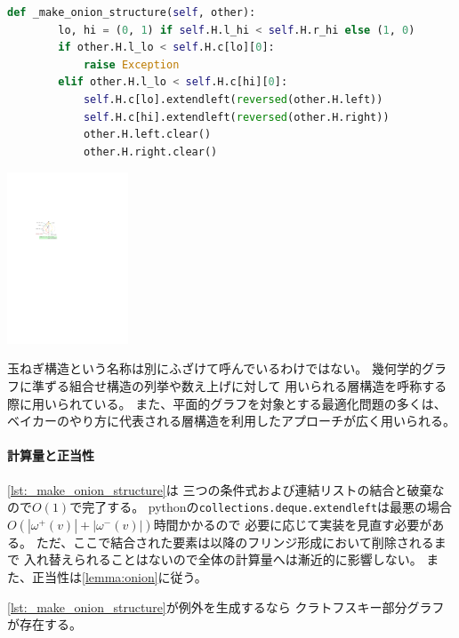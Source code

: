 \begin{paracol}{2}
\begin{lstlisting}[language=Python, caption=\_make\_onion\_structure,
                   label=lst:_make_onion_structure]
    def _make_onion_structure(self, other):
        lo, hi = (0, 1) if self.H.l_hi < self.H.r_hi else (1, 0)
        if other.H.l_lo < self.H.c[lo][0]:
            raise Exception
        elif other.H.l_lo < self.H.c[hi][0]:
            self.H.c[lo].extendleft(reversed(other.H.left))
            self.H.c[hi].extendleft(reversed(other.H.right))
            other.H.left.clear()
            other.H.right.clear()
\end{lstlisting}


\switchcolumn
\vspace{1.\intextsep}
\centering
\includegraphics[width=0.27\textwidth]{figures/illegal_onion_conditions.pdf}
\end{paracol}

玉ねぎ構造という名称は別にふざけて呼んでいるわけではない。
幾何学的グラフに準ずる組合せ構造の列挙や数え上げに対して
用いられる層構造を呼称する際に用いられている。
また、平面的グラフを対象とする最適化問題の多くは、
ベイカーのやり方に代表される層構造を利用したアプローチが広く用いられる。

\paragraph{計算量と正当性}
\lstrefname\ref{lst:_make_onion_structure}は
三つの条件式および連結リストの結合と破棄なので$O(1)$で完了する。
pythonの{\tt collections.deque.extendleft}は最悪の場合
$O(|\omega^+(v)|+|\omega^-(v)|)$時間かかるので
必要に応じて実装を見直す必要がある。
ただ、ここで結合された要素は以降のフリンジ形成において削除されるまで
入れ替えられることはないので全体の計算量へは漸近的に影響しない。
また、正当性は\cref{lemma:onion}に従う。

\begin{lemma}
\label{lemma:onion}
\lstrefname\ref{lst:_make_onion_structure}が例外を生成するなら
クラトフスキー部分グラフが存在する。
\end{lemma}


